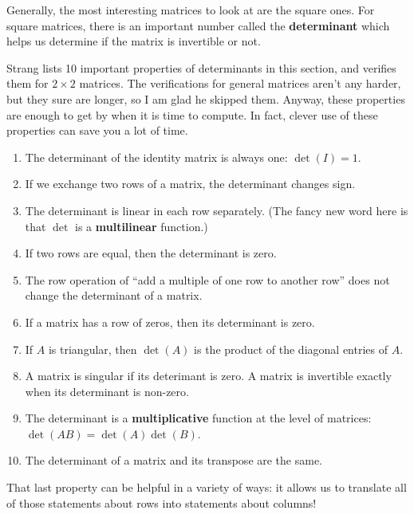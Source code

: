 \documentclass[10pt,]{book}
\newcommand{\terminology}[1]{\textbf{#1}}
\theoremstyle{plain}
\theoremstyle{definition}
\numberwithin{equation}{section}
\begin{document}
      Generally, the most interesting matrices to look at are the square ones.
      For square matrices, there is an important number called the
      \terminology{determinant} which helps us determine if the matrix is
      invertible or not.
\par

      Strang lists 10 important properties of determinants in this section,
      and verifies them for \(2\times 2\) matrices. The verifications for
      general matrices aren't any harder, but they sure are longer,
      so I am glad he skipped them. Anyway, these properties are enough to get
      by when it is time to compute. In fact, clever use of these properties
      can save you a lot of time.
\begin{enumerate}
\item{}The determinant of the identity matrix is always one: \(\det(I)=1\).\item{}If we exchange two rows of a matrix, the determinant changes sign.\item{}The determinant is linear in each row separately. (The fancy new word
        here is that \(\det\) is a \terminology{multilinear} function.)\item{}If two rows are equal, then the determinant is zero.\item{}The row operation of ``add a multiple of one row to another row''
        does not change the determinant of a matrix.\item{}If a matrix has a row of zeros, then its determinant is zero.\item{}If \(A\) is triangular, then \(\det(A)\) is the product of the
        diagonal entries of \(A\).\item{}A matrix is singular if its deterimant is zero. A matrix is invertible
        exactly when its determinant is non-zero.\item{}The determinant is a \terminology{multiplicative} function at the level
      of matrices: \(\det(AB) = \det(A)\det(B)\).\item{}The determinant of a matrix and its transpose are the same.\end{enumerate}
\par

      That last property can be helpful in a variety of ways: it allows us to translate
      all of those statements about rows into statements about columns!
\typeout{************************************************}
\typeout{************************************************}
\end{document}
